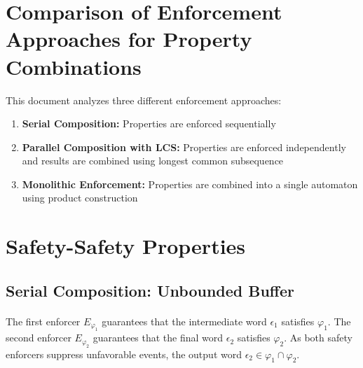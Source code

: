 \section{Comparison of Enforcement Approaches for Property Combinations}

This document analyzes three different enforcement approaches:
\begin{enumerate}
    \item \textbf{Serial Composition:} Properties are enforced sequentially
    \item \textbf{Parallel Composition with LCS:} Properties are enforced independently and results are combined using longest common subsequence
    \item \textbf{Monolithic Enforcement:} Properties are combined into a single automaton using product construction
\end{enumerate}

\section{Safety-Safety Properties}

\subsection{Serial Composition: Unbounded Buffer}

\paragraph{} 
The first enforcer $E_{\varphi_1}$ guarantees that the intermediate word $\epsilon_1$ satisfies $\varphi_1$. The second enforcer $E_{\varphi_2}$ guarantees that the final word $\epsilon_2$ satisfies $\varphi_2$. As both safety enforcers suppress unfavorable events, the output word $\epsilon_2 \in \varphi_1 \cap \varphi_2$.

